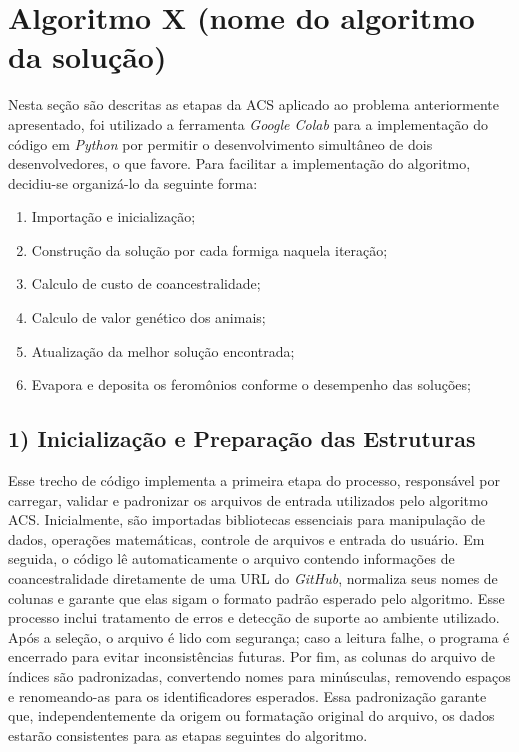\section{Algoritmo X (nome do algoritmo da solução)}
\label{sec-complexidade-algoritmo}

Nesta seção são descritas as etapas da ACS aplicado ao problema anteriormente apresentado, foi utilizado a ferramenta \textit{Google Colab} para a implementação do código em \textit{Python} por permitir o desenvolvimento simultâneo de dois desenvolvedores, o que favore. Para facilitar a implementação do algoritmo, decidiu-se organizá-lo da seguinte forma:
\begin{enumerate}
    \item Importação e inicialização;
    \item Construção da solução por cada formiga naquela iteração;
    \item Calculo de custo de coancestralidade;
    \item Calculo de valor genético dos animais;
    \item Atualização da melhor solução encontrada;
    \item Evapora e deposita os feromônios conforme o desempenho das soluções;
\end{enumerate}
\vspace{1em}

\subsection*{1) Inicialização e Preparação das Estruturas}
Esse trecho de código implementa a primeira etapa do processo, responsável por carregar, validar e padronizar os arquivos de entrada utilizados pelo algoritmo ACS. Inicialmente, são importadas bibliotecas essenciais para manipulação de dados, operações matemáticas, controle de arquivos e entrada do usuário. Em seguida, o código lê automaticamente o arquivo contendo informações de coancestralidade diretamente de uma URL do \textit{GitHub}, normaliza seus nomes de colunas e garante que elas sigam o formato padrão esperado pelo algoritmo. Esse processo inclui tratamento de erros e  detecção de suporte ao ambiente utilizado. Após a seleção, o arquivo é lido com segurança; caso a leitura falhe, o programa é encerrado para evitar inconsistências futuras. Por fim, as colunas do arquivo de índices são padronizadas, convertendo nomes para minúsculas, removendo espaços e renomeando-as para os identificadores esperados. Essa padronização garante que, independentemente da origem ou formatação original do arquivo, os dados estarão consistentes para as etapas seguintes do algoritmo.

